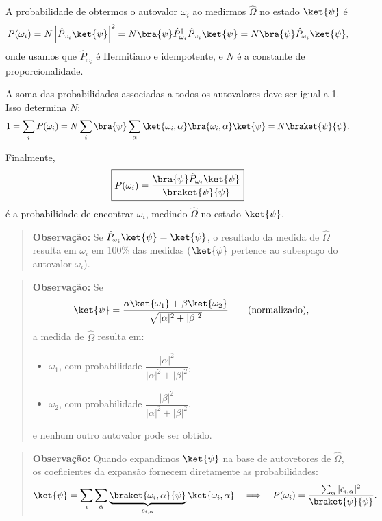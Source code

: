 A probabilidade de obtermos o autovalor $\omega_i$ ao medirmos $\hat{\Omega}$ no estado $\ket{\psi}$ é
\begin{equation}
P(\omega_i) = N \left|\hat{P}_{\omega_i}\ket{\psi}\right|^2 = N\bra{\psi}\hat{P}_{\omega_i}^\dagger \hat{P}_{\omega_i}\ket{\psi} = N\bra{\psi}\hat{P}_{\omega_i}\ket{\psi},
\end{equation}
onde usamos que $\hat{P}_{\omega_i}$ é Hermitiano e idempotente, e $N$ é a constante de proporcionalidade.

A soma das probabilidades associadas a todos os autovalores deve ser igual a 1. Isso determina $N$:
\begin{equation}
1 = \sum_i P(\omega_i) = N \sum_i \bra{\psi}\sum_\alpha \ket{\omega_i,\alpha}\bra{\omega_i,\alpha}\ket{\psi} = N\braket{\psi}{\psi}.
\end{equation}

Finalmente,
\begin{equation}
\label{eq:aula11_prob_discreta}
\boxed{P(\omega_i) = \frac{\bra{\psi}\hat{P}_{\omega_i}\ket{\psi}}{\braket{\psi}{\psi}}}
\end{equation}
é a probabilidade de encontrar $\omega_i$, medindo $\hat{\Omega}$ no estado $\ket{\psi}$.

\begin{quote}
\textbf{Observação:} Se $\hat{P}_{\omega_i}\ket{\psi} = \ket{\psi}$, o resultado da medida de $\hat{\Omega}$ resulta em $\omega_i$ em 100\% das medidas ($\ket{\psi}$ pertence ao subespaço do autovalor $\omega_i$).
\end{quote}

\begin{quote}
\textbf{Observação:} Se
\begin{equation}
\ket{\psi} = \frac{\alpha\ket{\omega_1} + \beta\ket{\omega_2}}{\sqrt{|\alpha|^2 + |\beta|^2}} \qquad \text{(normalizado)},
\end{equation}
a medida de $\hat{\Omega}$ resulta em:
\begin{itemize}
\item $\omega_1$, com probabilidade $\dfrac{|\alpha|^2}{|\alpha|^2 + |\beta|^2}$,
\item $\omega_2$, com probabilidade $\dfrac{|\beta|^2}{|\alpha|^2 + |\beta|^2}$,
\end{itemize}
e nenhum outro autovalor pode ser obtido.
\end{quote}

\begin{quote}
\textbf{Observação:} Quando expandimos $\ket{\psi}$ na base de autovetores de $\hat{\Omega}$, os coeficientes da expansão fornecem diretamente as probabilidades:
\begin{equation}
\ket{\psi} = \sum_i \sum_\alpha \underbrace{\braket{\omega_i,\alpha}{\psi}}_{c_{i,\alpha}} \ket{\omega_i,\alpha} \quad \Longrightarrow \quad P(\omega_i) = \frac{\sum_\alpha |c_{i,\alpha}|^2}{\braket{\psi}{\psi}}.
\end{equation}
\end{quote}

